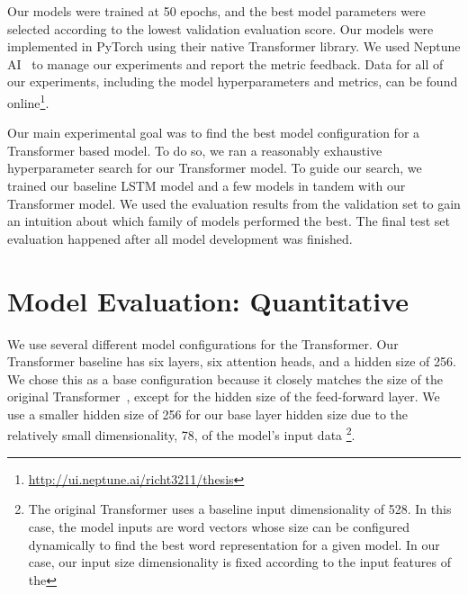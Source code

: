 Our models were trained at 50 epochs, and the best model parameters were selected according to the lowest validation evaluation score. Our models were implemented in PyTorch using their native Transformer library. We used Neptune AI~\cite{neptune} to manage our experiments and report the metric feedback. Data for all of our experiments, including the model hyperparameters and metrics, can be found online\footnote{\url{http://ui.neptune.ai/richt3211/thesis}}. 

Our main experimental goal was to find the best model configuration for a Transformer based model. To do so, we ran a reasonably exhaustive hyperparameter search for our Transformer model. To guide our search, we trained our baseline LSTM model and a few \vnet{} models in tandem with our Transformer model. We used the evaluation results from the validation set to gain an intuition about which family of models performed the best. The final test set evaluation happened after all model development was finished. 

\section{Model Evaluation: Quantitative}
We use several different model configurations for the Transformer. Our Transformer baseline has six layers, six attention heads, and a hidden size of 256. We chose this as a base configuration because it closely matches the size of the original Transformer~\cite{vaswani2017attention}, except for the hidden size of the feed-forward layer. We use a smaller hidden size of 256 for our base layer hidden size due to the relatively small dimensionality, 78, of the model's input data%
\footnote{The original Transformer uses a baseline input dimensionality of 528. In this case, the model inputs are word vectors whose size can be configured dynamically to find the best word representation for a given model. In our case, our input size dimensionality is fixed according to the input features of the \vnetf{}}.

